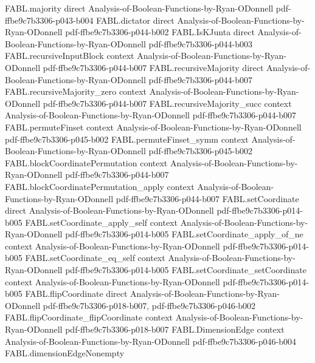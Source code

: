 \begin{theorem}
\proofstep
  {FABL.majority}
  {direct}
  {Analysis-of-Boolean-Functions-by-Ryan-ODonnell}
  {pdf-ffbe9c7b3306-p043-b004}
\proofstep
  {FABL.dictator}
  {direct}
  {Analysis-of-Boolean-Functions-by-Ryan-ODonnell}
  {pdf-ffbe9c7b3306-p044-b002}
\proofstep
  {FABL.IsKJunta}
  {direct}
  {Analysis-of-Boolean-Functions-by-Ryan-ODonnell}
  {pdf-ffbe9c7b3306-p044-b003}
\proofstep
  {FABL.recursiveInputBlock}
  {context}
  {Analysis-of-Boolean-Functions-by-Ryan-ODonnell}
  {pdf-ffbe9c7b3306-p044-b007}
\proofstep
  {FABL.recursiveMajority}
  {direct}
  {Analysis-of-Boolean-Functions-by-Ryan-ODonnell}
  {pdf-ffbe9c7b3306-p044-b007}
\proofstep
  {FABL.recursiveMajority_zero}
  {context}
  {Analysis-of-Boolean-Functions-by-Ryan-ODonnell}
  {pdf-ffbe9c7b3306-p044-b007}
\proofstep
  {FABL.recursiveMajority_succ}
  {context}
  {Analysis-of-Boolean-Functions-by-Ryan-ODonnell}
  {pdf-ffbe9c7b3306-p044-b007}
\proofstep
  {FABL.permuteFinset}
  {context}
  {Analysis-of-Boolean-Functions-by-Ryan-ODonnell}
  {pdf-ffbe9c7b3306-p045-b002}
\proofstep
  {FABL.permuteFinset_symm}
  {context}
  {Analysis-of-Boolean-Functions-by-Ryan-ODonnell}
  {pdf-ffbe9c7b3306-p045-b002}
\proofstep
  {FABL.blockCoordinatePermutation}
  {context}
  {Analysis-of-Boolean-Functions-by-Ryan-ODonnell}
  {pdf-ffbe9c7b3306-p044-b007}
\proofstep
  {FABL.blockCoordinatePermutation_apply}
  {context}
  {Analysis-of-Boolean-Functions-by-Ryan-ODonnell}
  {pdf-ffbe9c7b3306-p044-b007}
\proofstep
  {FABL.setCoordinate}
  {direct}
  {Analysis-of-Boolean-Functions-by-Ryan-ODonnell}
  {pdf-ffbe9c7b3306-p014-b005}
\proofstep
  {FABL.setCoordinate_apply_self}
  {context}
  {Analysis-of-Boolean-Functions-by-Ryan-ODonnell}
  {pdf-ffbe9c7b3306-p014-b005}
\proofstep
  {FABL.setCoordinate_apply_of_ne}
  {context}
  {Analysis-of-Boolean-Functions-by-Ryan-ODonnell}
  {pdf-ffbe9c7b3306-p014-b005}
\proofstep
  {FABL.setCoordinate_eq_self}
  {context}
  {Analysis-of-Boolean-Functions-by-Ryan-ODonnell}
  {pdf-ffbe9c7b3306-p014-b005}
\proofstep
  {FABL.setCoordinate_setCoordinate}
  {context}
  {Analysis-of-Boolean-Functions-by-Ryan-ODonnell}
  {pdf-ffbe9c7b3306-p014-b005}
\proofstep
  {FABL.flipCoordinate}
  {direct}
  {Analysis-of-Boolean-Functions-by-Ryan-ODonnell}
  {pdf-ffbe9c7b3306-p018-b007,
    pdf-ffbe9c7b3306-p046-b002}
\proofstep
  {FABL.flipCoordinate_flipCoordinate}
  {context}
  {Analysis-of-Boolean-Functions-by-Ryan-ODonnell}
  {pdf-ffbe9c7b3306-p018-b007}
\proofstep
  {FABL.DimensionEdge}
  {context}
  {Analysis-of-Boolean-Functions-by-Ryan-ODonnell}
  {pdf-ffbe9c7b3306-p046-b004}
\proofstep
  {FABL.dimensionEdgeNonempty}

\end{theorem}
